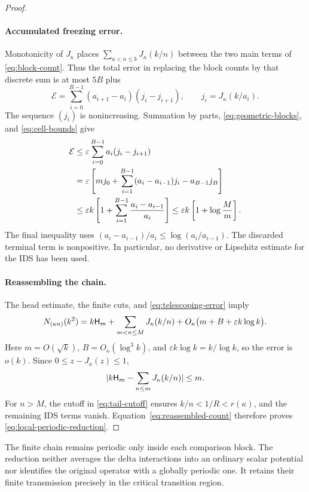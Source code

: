 \begin{proof}
\paragraph{Accumulated freezing error.}
Monotonicity of $J_\kappa$ places
$\sum_{a<n\le b}J_\kappa(k/n)$ between the two main terms
of \eqref{eq:block-count}. Thus the total error in replacing
the block counts by that discrete sum is at most $5B$ plus
\[
 \mathcal E=\sum_{i=0}^{B-1}
       (a_{i+1}-a_i)(j_i-j_{i+1}),
 \qquad j_i=J_\kappa(k/a_i).
\]
The sequence $(j_i)$ is nonincreasing. Summation by parts,
\eqref{eq:geometric-blocks}, and \eqref{eq:cell-bounds} give
\begin{align}
 \mathcal E
 &\le\varepsilon\sum_{i=0}^{B-1}a_i(j_i-j_{i+1})\notag\\
 &=\varepsilon\left[
        m j_0+\sum_{i=1}^{B-1}(a_i-a_{i-1})j_i
                        -a_{B-1}j_B\right]\notag\\
 &\le\varepsilon k\left[
              1+\sum_{i=1}^{B-1}\frac{a_i-a_{i-1}}{a_i}\right]
 \le\varepsilon k\left[1+\log\frac{M}{m}\right].
 \label{eq:telescoping-error}
\end{align}
The final inequality uses
$(a_i-a_{i-1})/a_i\le\log(a_i/a_{i-1})$.
The discarded terminal term is nonpositive. In particular,
no derivative or Lipschitz estimate for the IDS has been used.

\paragraph{Reassembling the chain.}
The head estimate, the finite cuts, and
\eqref{eq:telescoping-error} imply
\begin{equation}
 N_{(\kappa n)}(k^2)
   =k\mathsf H_m+\sum_{m<n\le M}J_\kappa(k/n)
       +O_\kappa\bigl(m+B+\varepsilon k\log k\bigr).
 \label{eq:reassembled-count}
\end{equation}
Here $m=O(\sqrt{k})$, $B=O_\kappa(\log^3 k)$, and
$\varepsilon k\log k=k/\log k$, so the error is $o(k)$.
Since $0\le z-J_\kappa(z)\le1$,
\[
 \lvert k\mathsf H_m-\sum_{n\le m}J_\kappa(k/n)\rvert\le m.
\]
For $n>M$, the cutoff in \eqref{eq:tail-cutoff} ensures
$k/n<1/R<r(\kappa)$, and the remaining IDS terms vanish.
Equation~\eqref{eq:reassembled-count} therefore proves
\eqref{eq:local-periodic-reduction}.
\end{proof}

The finite chain remains periodic only inside each comparison
block. The reduction neither averages the delta interactions
into an ordinary scalar potential nor identifies the original
operator with a globally periodic one. It retains their
finite transmission precisely in the critical transition region.
